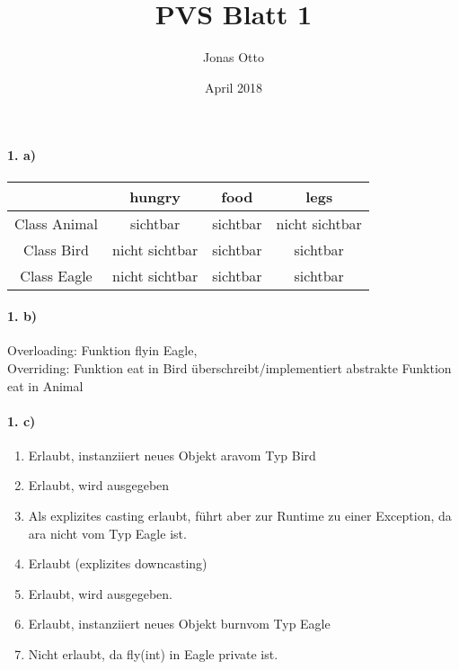 \documentclass{article}
\title{PVS Blatt 1}
\author{Jonas Otto}
\date{April 2018}
\begin{document}
\maketitle

\paragraph{1. a)}

\begin{tabular}{c c c c}
                    & hungry            & food      & legs          \\\hline
    Class Animal    & sichtbar          & sichtbar  & nicht sichtbar\\
    Class Bird      & nicht sichtbar    & sichtbar  & sichtbar      \\
    Class Eagle     & nicht sichtbar    & sichtbar  & sichtbar
\end{tabular}

\paragraph{1. b)}
Overloading: Funktion \glqq fly\grqq in Eagle, \\
Overriding: Funktion eat in Bird überschreibt/implementiert abstrakte Funktion eat in Animal

\paragraph{1. c)}
\begin{enumerate}
    \item Erlaubt, instanziiert neues Objekt \glqq ara\grqq vom Typ Bird\\
    \item Erlaubt, \grqq wird ausgegeben\\
    \item Als explizites casting erlaubt, führt aber zur Runtime zu einer Exception, da ara nicht vom Typ Eagle ist.\\
    \item Erlaubt (explizites downcasting)\\
    \item Erlaubt, \grqq wird ausgegeben.\\
    \item Erlaubt, instanziiert neues Objekt \glqq burn\grqq vom Typ Eagle\\
    \item Nicht erlaubt, da fly(int) in Eagle private ist.\\
\end{enumerate}
\end{document}
